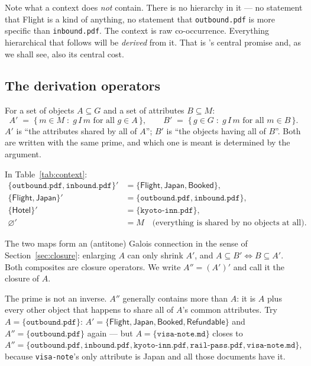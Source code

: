 Note what a context does \emph{not} contain. There is no hierarchy in it --- no
statement that \textsf{Flight} is a kind of anything, no statement that
\texttt{outbound.pdf} is more specific than \texttt{inbound.pdf}. The context
is raw co-occurrence. Everything hierarchical that follows will be
\emph{derived} from it. That is \fca{}'s central promise and, as we shall see,
also its central cost.

\subsection{The derivation operators}
\label{sec:derivation}

\begin{definition}[Derivation]
For a set of objects $A \subseteq G$ and a set of attributes $B \subseteq M$:
\[
  A' \;=\; \{\, m \in M \;:\; g\,I\,m \text{ for all } g \in A \,\},
  \qquad
  B' \;=\; \{\, g \in G \;:\; g\,I\,m \text{ for all } m \in B \,\}.
\]
$A'$ is ``the attributes shared by all of $A$''; $B'$ is ``the objects having
all of $B$''. Both are written with the same prime, and which one is meant is
determined by the argument.
\end{definition}

\begin{example}
In Table~\ref{tab:context}:
\begin{align*}
\{\texttt{outbound.pdf}, \texttt{inbound.pdf}\}' &=
  \{\textsf{Flight}, \textsf{Japan}, \textsf{Booked}\},\\
\{\textsf{Flight}, \textsf{Japan}\}' &=
  \{\texttt{outbound.pdf}, \texttt{inbound.pdf}\},\\
\{\textsf{Hotel}\}' &= \{\texttt{kyoto-inn.pdf}\}, \\
\varnothing' &= M \quad\text{(everything is shared by no objects at all).}
\end{align*}
\end{example}

The two maps form an (antitone) Galois connection in the sense of
Section~\ref{sec:closure}: enlarging $A$ can only shrink $A'$, and
$A \subseteq B' \iff B \subseteq A'$. Both composites are closure operators.
We write $A'' = (A')'$ and call it the closure of $A$.

\begin{pitfall}
The prime is not an inverse. $A''$ generally contains more than $A$: it is
$A$ plus every other object that happens to share all of $A$'s common
attributes. Try $A = \{\texttt{outbound.pdf}\}$: $A' =
\{\textsf{Flight},\textsf{Japan},\textsf{Booked},\textsf{Refundable}\}$ and
$A'' = \{\texttt{outbound.pdf}\}$ again --- but
$A = \{\texttt{visa-note.md}\}$ closes to $A'' =
\{\texttt{outbound.pdf}, \texttt{inbound.pdf}, \texttt{kyoto-inn.pdf},
\texttt{rail-pass.pdf}, \texttt{visa-note.md}\}$, because \texttt{visa-note}'s
only attribute is \textsf{Japan} and all those documents have it.
\end{pitfall}

